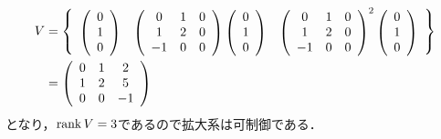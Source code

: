 \begin{frame}[t]
\begin{align}
 V &=
 \left\{
 \begin{array}{ccc}
 \left(
 \begin{array}{c}
  0 \\
  1 \\
  0
 \end{array}
 \right) &
 \left(
 \begin{array}{ccc}
  0 & 1 & 0 \\
  1 & 2 & 0 \\
  -1 & 0 & 0 \\
 \end{array}
 \right)
 \left(
 \begin{array}{c}
  0 \\
  1 \\
  0
 \end{array}
 \right) &
 \left(
 \begin{array}{ccc}
  0 & 1 & 0 \\
  1 & 2 & 0 \\
  -1 & 0 & 0 \\
 \end{array}
 \right)^2
 \left(
 \begin{array}{c}
  0 \\
  1 \\
  0
 \end{array}
 \right)
 \end{array}
 \right\} \notag\\&=
 \left(
 \begin{array}{ccc}
  0 & 1 & 2 \\
  1 & 2 & 5 \\
  0 & 0 & -1 \\
 \end{array}
 \right)\notag
\end{align}
となり，$\mathop{\rm rank}\nolimits V = 3$であるので拡大系は可制御である．
\end{frame}


